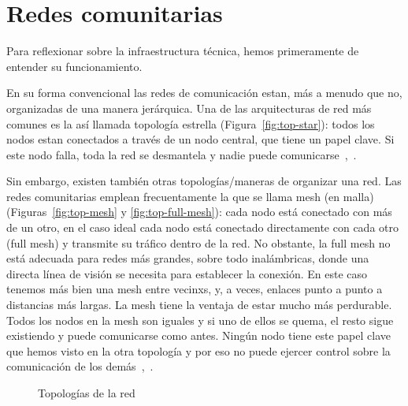 \section{Redes comunitarias}

Para reflexionar sobre la infraestructura técnica, hemos primeramente de entender su funcionamiento.

En su forma convencional las redes de comunicación estan, más a menudo que no, organizadas de una manera jerárquica.
Una de las arquitecturas de red más comunes es la así llamada topología estrella (Figura~\vref{fig:top-star}):
todos los nodos estan conectados a través de un nodo central, que tiene un papel clave.
Si este nodo falla, toda la red se desmantela y nadie puede comunicarse~\autocite{Mabb2014},~\autocite{Medosch2004}.

Sin embargo, existen también otras topologías/maneras de organizar una red.
Las redes comunitarias emplean frecuentamente la que se llama mesh (en malla) (Figuras~\vref{fig:top-mesh} y \vref{fig:top-full-mesh}):
cada nodo está conectado con más de un otro, en el caso ideal cada nodo está conectado directamente con cada otro (full mesh) y transmite su tráfico dentro de la red.
No obstante, la full mesh no está adecuada para redes más grandes, sobre todo inalámbricas, donde una directa línea de visión se necesita para establecer la conexión.
En este caso tenemos más bien una mesh entre vecinxs, y, a veces, enlaces punto a punto a distancias más largas.
La mesh tiene la ventaja de estar mucho más perdurable.
Todos los nodos en la mesh son iguales y si uno de ellos se quema, el resto sigue existiendo y puede comunicarse como antes.
Ningún nodo tiene este papel clave que hemos visto en la otra topología y por eso no puede ejercer control sobre la comunicación de los demás~\autocite{FiTre2015},~\autocite{Medosch2004}.

\begin{figure}[b]
\centering
{} \quad
{} \quad
{}
\caption[Topologies]{Topologías de la red} %
\label{fig:topologies}
\end{figure}

